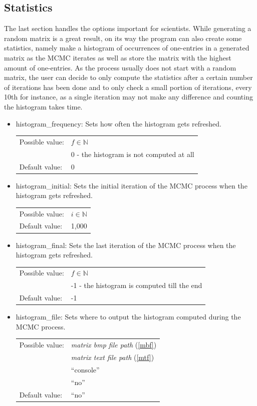 \subsection{Statistics}
The last section handles the options important for scientists. While generating a random matrix is a great result, on its way the program can also create some statistics, namely make a histogram of occurrences of one-entries in a generated matrix as the MCMC iterates as well as store the matrix with the highest amount of one-entries. As the process usually does not start with a random matrix, the user can decide to only compute the statistics after a certain number of iterations has been done and to only check a small portion of iterations, every 10th for instance, as a single iteration may not make any difference and counting the histogram takes time.
\begin{itemize}
\item histogram\_frequency: Sets how often the histogram gets refreshed.

\begin{tabular}{ll}
Possible value: & $f\in\mathbb{N}$ \\
& 0 - the histogram is not computed at all \\
Default value: & 0
\end{tabular}

\item histogram\_initial: Sets the initial iteration of the MCMC process when the histogram gets refreshed.

\begin{tabular}{ll}
Possible value: & $i\in\mathbb{N}$ \\
Default value: & 1,000
\end{tabular}

\item histogram\_final: Sets the last iteration of the MCMC process when the histogram gets refreshed.

\begin{tabular}{ll}
Possible value: & $f\in\mathbb{N}$ \\
& -1 - the histogram is computed till the end \\
Default value: & -1
\end{tabular}

\item histogram\_file: Sets where to output the histogram computed during the MCMC process.

\begin{tabular}{ll}
Possible value: & \textit{matrix bmp file path} (\ref{mbf}) \\
& \textit{matrix text file path} (\ref{mtf}) \\
& ``console'' \\
& ``no'' \\
Default value: & ``no''
\end{tabular}


\end{itemize}
